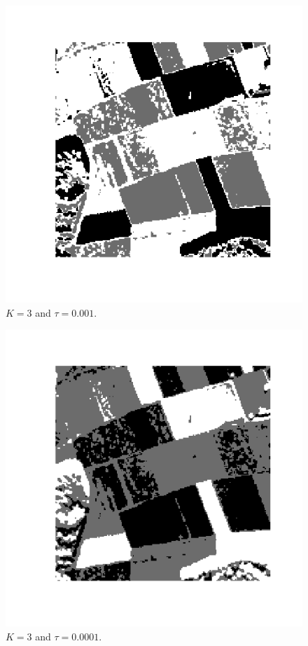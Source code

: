 \documentclass[twoside]{Homework}
\begin{document}
\begin{figure}[!ht]
  \centering
    \includegraphics[scale=0.6]{3-0001.png}
  \caption{$K=3$ and $\tau=0.001$.}
\end{figure}
\begin{figure}[!ht]
  \centering
    \includegraphics[scale=0.6]{3-00001.png}
  \caption{$K=3$ and $\tau=0.0001$.}
\end{figure}
\end{document}
